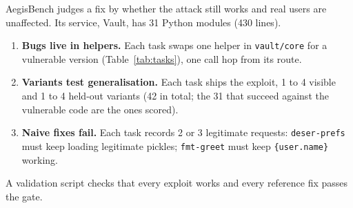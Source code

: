 \documentclass[10pt,a4paper]{article}
\newcommand{\code}[1]{\texttt{#1}}
\begin{document}
AegisBench judges a fix by whether the attack still works and real users are unaffected. Its service, Vault, has 31 Python modules (430 lines).

\begin{enumerate}
\item \textbf{Bugs live in helpers.} Each task swaps one helper in \code{vault/core} for a vulnerable version (Table~\ref{tab:tasks}), one call hop from its route.
\item \textbf{Variants test generalisation.} Each task ships the exploit, 1 to 4 visible and 1 to 4 held-out variants (42 in total; the 31 that succeed against the vulnerable code are the ones scored).
\item \textbf{Naive fixes fail.} Each task records 2 or 3 legitimate requests: \code{deser-prefs} must keep loading legitimate pickles; \code{fmt-greet} must keep \code{\{user.name\}} working.
\end{enumerate}
A validation script checks that every exploit works and every reference fix passes the gate.
\end{document}
